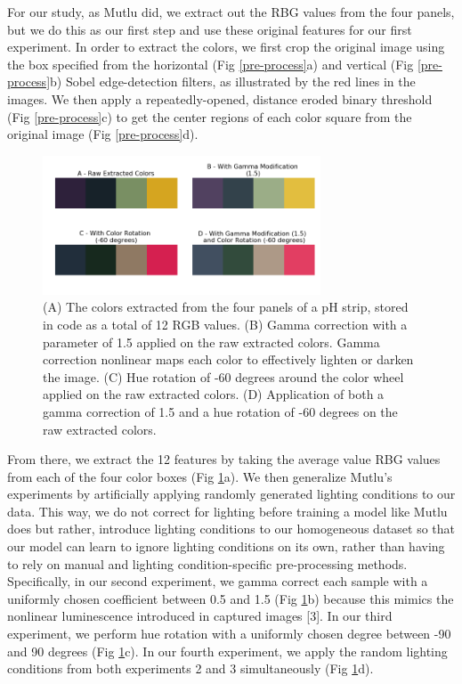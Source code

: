 \documentclass[journal]{IEEEtran}
\begin{document}
For our study, as Mutlu did, we extract out the RBG values from the four panels, but we do this as our first step and use these original features for our first experiment. In order to extract the colors, we first crop the original image using the box specified from the horizontal (Fig \ref{pre-process}a) and vertical (Fig \ref{pre-process}b) Sobel edge-detection filters, as illustrated by the red lines in the images. We then apply a repeatedly-opened, distance eroded binary threshold (Fig \ref{pre-process}c) to get the center regions of each color square from the original image (Fig \ref{pre-process}d).

\begin{figure}
\centering
\includegraphics[width=3.25in]{Fig_3.png}
\caption{(A) The colors extracted from the four panels of a pH strip, stored in code as a total of 12 RGB values. (B) Gamma correction with a parameter of 1.5 applied on the raw extracted colors. Gamma correction nonlinear maps each color to effectively lighten or darken the image. (C) Hue rotation of -60 degrees around the color wheel applied on the raw extracted colors. (D) Application of both a gamma correction of 1.5 and a hue rotation of -60 degrees on the raw extracted colors.}
\label{four-colors}
\end{figure}

From there, we extract the 12 features by taking the average value RBG values from each of the four color boxes (Fig \ref{four-colors}a). We then generalize Mutlu’s experiments by artificially applying randomly generated lighting conditions to our data. This way, we do not correct for lighting before training a model like Mutlu does but rather, introduce lighting conditions to our homogeneous dataset so that our model can learn to ignore lighting conditions on its own, rather than having to rely on manual and lighting condition-specific pre-processing methods. Specifically, in our second experiment, we gamma correct each sample with a uniformly chosen coefficient between 0.5 and 1.5 (Fig \ref{four-colors}b) because this mimics the nonlinear luminescence introduced in captured images [3]. In our third experiment, we perform hue rotation with a uniformly chosen degree between -90 and 90 degrees (Fig \ref{four-colors}c). In our fourth experiment, we apply the random lighting conditions from both experiments 2 and 3 simultaneously (Fig \ref{four-colors}d).
\end{document}
